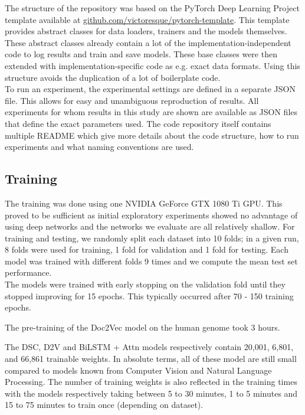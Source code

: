 The structure of the repository was based on the PyTorch Deep Learning Project template available at \url{github.com/victoresque/pytorch-template}. This template provides abstract classes for data loaders, trainers and the models themselves. These abstract classes already contain a lot of the implementation-independent code to log results and train and save models. These base classes were then extended with implementation-specific code as e.g. exact data formats. Using this structure avoids the duplication of a lot of boilerplate code.\\
To run an experiment, the experimental settings are defined in a separate JSON file. This allows for easy and unambiguous reproduction of results. All experiments for whom results in this study are shown are available as JSON files that define the exact parameters used.
The code repository itself contains multiple README which give more details about the code structure, how to run experiments and what naming conventions are used. 


\subsection{Training} \label{subsec:training_details}
The training was done using one NVIDIA GeForce GTX 1080 Ti GPU. This proved to be sufficient as initial exploratory experiments showed no advantage of using deep networks and the networks we evaluate are all relatively shallow. For training and testing, we randomly split each dataset into 10 folds; in a given run, 8 folds were used for training, 1 fold for validation and 1 fold for testing. Each model was trained with different folds 9 times and we compute the mean test set performance.\\
The models were trained with early stopping on the validation fold until they stopped improving for 15 epochs. This typically occurred after 70 - 150 training epochs.

The pre-training of the Doc2Vec model on the human genome took 3 hours. 

The DSC, D2V and BiLSTM + Attn models respectively contain 20,001, 6,801, and 66,861 trainable weights. In absolute terms, all of these model are still small compared to models known from Computer Vision and Natural Language Processing. The number of training weights is also reflected in the training times with the models respectively taking between 5 to 30 minutes, 1 to 5 minutes and 15 to 75 minutes to train once (depending on dataset). 

